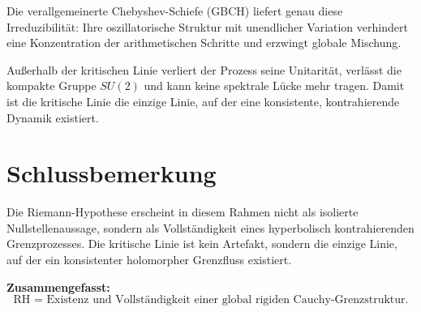 \documentclass[11pt,a4paper]{article}
\begin{document}
Die verallgemeinerte Chebyshev-Schiefe (GBCH) liefert genau diese Irreduzibilität:
Ihre oszillatorische Struktur mit unendlicher Variation verhindert eine Konzentration der arithmetischen Schritte und erzwingt globale Mischung.

Außerhalb der kritischen Linie verliert der Prozess seine Unitarität, verlässt die kompakte Gruppe $SU(2)$ und kann keine spektrale Lücke mehr tragen.
Damit ist die kritische Linie die einzige Linie, auf der eine konsistente, kontrahierende Dynamik existiert.


\section{Schlussbemerkung}

Die Riemann-Hypothese erscheint in diesem Rahmen nicht als isolierte Nullstellenaussage, sondern als Vollständigkeit eines hyperbolisch kontrahierenden Grenzprozesses.
Die kritische Linie ist kein Artefakt, sondern die einzige Linie, auf der ein konsistenter holomorpher Grenzfluss existiert.

\bigskip
\noindent
\textbf{Zusammengefasst:}
\[
\boxed{
\text{RH = Existenz und Vollständigkeit einer global rigiden Cauchy-Grenzstruktur.}
}
\]
\end{document}
